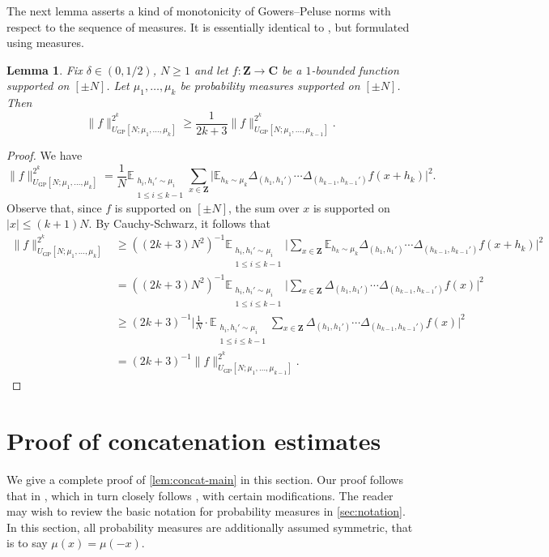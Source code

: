 \documentclass[11pt,reqno]{amsart}
\numberwithin{equation}{section}
\newtheorem{lemma}[theorem]{Lemma}
\theoremstyle{definition}
\theoremstyle{remark}
\newcommand{\snorm}[1]{\lVert#1\rVert}
\newcommand{\mb}{\mathbb}
\renewcommand{\le}{\leqslant}
\renewcommand{\ge}{\geqslant}
\newcommand\Z{\mathbf{Z}}
\newcommand\C{\mathbf{C}}
\newcommand\E{\mb{E}}
\newcommand\GP{\operatorname{GP}}
\begin{document}
The next lemma asserts a kind of monotonicity of Gowers--Peluse norms with respect to the sequence of measures. It is essentially identical to \cite[Lemma~3.5 (iii)]{KKL24}, but formulated using measures.
\begin{lemma}\label{lem:prop-box}
Fix $\delta\in (0,1/2)$, $N\ge 1$ and let $f:\Z\to\C$ be a $1$-bounded function supported on $[\pm N]$.
Let $\mu_1,\ldots,\mu_k$ be probability measures supported on $[\pm N]$. Then
    \[\snorm{f}_{U_{\GP}[N;\mu_1,\ldots,\mu_k]}^{2^k}\ge \frac{1}{2k+3} \snorm{f}_{U_{\GP}[N;\mu_1,\ldots,\mu_{k-1}]}^{2^{k}}.\]\end{lemma}
\begin{proof}
We have
\[ \snorm{f}_{U_{\GP}[N;\mu_1,\ldots,\mu_k]}^{2^k} =\frac{1}{N} \E_{\substack{h_i,h_i'\sim \mu_i\\1\le i\le k-1}}\sum_{x\in \Z}\Big|\E_{h_k\sim \mu_k}\Delta_{(h_1,h_1')}\cdots \Delta_{(h_{k-1},h_{k-1}')}f(x+h_k)\Big|^2.\]
Observe that, since $f$ is supported on $[\pm N]$, the sum over $x$ is supported on $|x| \le (k+1) N$. By Cauchy-Schwarz, it follows that
\begin{align*}
 \snorm{f}_{U_{\GP}[N;\mu_1,\ldots,\mu_k]}^{2^k}
&\ge ((2k+3) N^2)^{-1} \E_{\substack{h_i,h_i'\sim \mu_i\\1\le i\le k-1}}\Big|\sum_{x\in \Z}\E_{h_k\sim \mu_k}\Delta_{(h_1,h_1')}\cdots \Delta_{(h_{k-1},h_{k-1}')}f(x+h_k)\Big|^2\\
&= ((2k+3) N^2)^{-1}  \E_{\substack{h_i,h_i'\sim \mu_i\\1\le i\le k-1}}\Big|\sum_{x\in \Z}\Delta_{(h_1,h_1')}\cdots \Delta_{(h_{k-1},h_{k-1}')}f(x)\Big|^2\\
&\ge (2k+3)^{-1} \Big| \frac{1}{N}\cdot \E_{\substack{h_i,h_i'\sim \mu_i\\1\le i\le k-1}} \sum_{x\in \Z}\Delta_{(h_1,h_1')}\cdots \Delta_{(h_{k-1},h_{k-1}')}f(x)\Big|^2\\
& = (2k+3)^{-1}  \snorm{f}_{U_{\GP}[N;\mu_1,\ldots,\mu_{k-1}]}^{2^{k}}.
\end{align*}
\end{proof}



\section{Proof of concatenation estimates}\label{appendixB}

We give a complete proof of \cref{lem:concat-main} in this section. Our proof follows that in \cite[Section~6]{KKL24}, which in turn closely follows \cite[Section 2]{kuca}, with certain modifications. The reader may wish to review the basic notation for probability measures in \cref{sec:notation}. In this section, all probability measures are additionally assumed symmetric, that is to say $\mu(x) = \mu(-x)$. 
\end{document}
